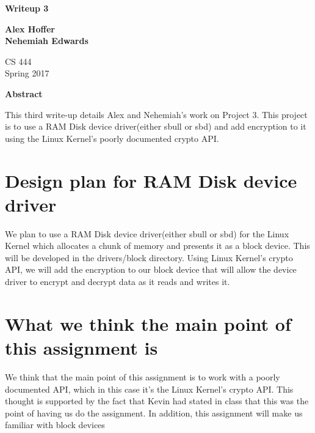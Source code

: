 \documentclass[letterpaper,10pt,titlepage]{article}
\begin{document}
\begin{titlepage}
    \begin{center}
        \vspace*{3.5cm}

        \textbf{Writeup 3}

        \vspace{0.5cm}

        \textbf{Alex Hoffer\\}
	\textbf{Nehemiah Edwards}

        \vspace{0.8cm}

        CS 444\\
        Spring 2017\\

        \vspace{1cm}

        \textbf{Abstract}\\

        \vspace{0.5cm}

	This third write-up details Alex and Nehemiah's work on Project 3. This project is to use a RAM Disk 			device driver(either sbull or sbd) and add encryption to it using the Linux Kernel's poorly documented 
	crypto API.

        \vfill

    \end{center}
\end{titlepage}

\newpage

\tableofcontents

\newpage

\section{Design plan for RAM Disk device driver}
We plan to use a RAM Disk device driver(either sbull or sbd) for the Linux Kernel which allocates a chunk of memory and presents it as a block device. This will be developed in the drivers/block directory. Using Linux Kernel's crypto API, we will add the encryption to our block device that will allow the device driver to encrypt and decrypt data as it reads and writes it.

\section{What we think the main point of this assignment is}
We think that the main point of this assignment is to work with a poorly documented API, which in this case it's the Linux Kernel's crypto API. This thought is supported by the fact that Kevin had stated in class that this was the point of having us do the assignment. In addition, this assignment will make us familiar with block devices
\end{document}
